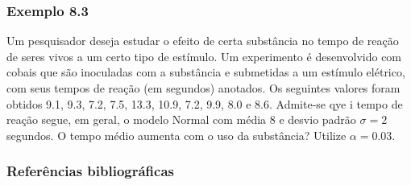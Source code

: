 \documentclass[11pt]{beamer}
\begin{document}
\begin{frame}
\frametitle{Exemplo 8.3}
Um pesquisador deseja estudar o efeito de certa substância no tempo de reação de seres vivos a um certo tipo de estímulo. Um experimento é desenvolvido com cobais que são inoculadas com a substância e submetidas a um estímulo elétrico, com seus tempos de reação (em segundos) anotados. Os seguintes valores foram obtidos 9.1, 9.3, 7.2, 7.5, 13.3, 10.9, 7.2, 9.9, 8.0 e 8.6. Admite-se qye i tempo de reação segue, em geral, o modelo Normal com média 8 e desvio padrão \(\sigma =2\) segundos. O tempo médio aumenta com o uso da substância? Utilize \(\alpha=0.03\).
\vspace{1in}
\vspace{1in}

\end{frame}

\begin{frame}
\frametitle{Referências bibliográficas}
\printbibliography
\end{frame}
\end{document}
